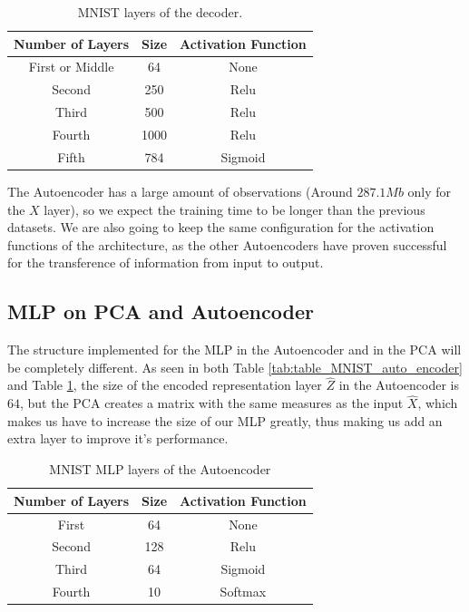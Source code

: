\begin{table}[H]
	\caption{MNIST layers of the decoder.}
	\label{tab:table_MNIST_auto_decoder}
	\begin{center}
		\begin{tabular}{c|c|c} %
			\textbf{Number of Layers} & \textbf{Size} & \textbf{Activation Function} \\
			\hline
			First or Middle & 64 & None\\
			Second & 250 & Relu\\
			Third & 500  & Relu\\
			Fourth & 1000 & Relu\\
			Fifth & 784 & Sigmoid \\
		\end{tabular}
	\end{center}
\end{table}

The Autoencoder has a large amount of observations (Around $287.1Mb$ only for the $X$ layer), so we expect the training time to be longer than the previous datasets. We are also going to keep the same configuration for the activation functions of the architecture, as the other Autoencoders  have proven successful for the transference of information from input to output. 

\subsection{MLP on PCA and Autoencoder}

The structure implemented for the MLP in the Autoencoder and in the PCA will be completely different. As seen in both Table \ref{tab:table_MNIST_auto_encoder} and Table \ref{tab:table_MNIST_auto_decoder}, the size of the encoded representation layer $\hat Z$ in the Autoencoder is $64$, but the PCA creates a matrix with the same measures as the input $\hat{X}$, which makes us have to increase the size of our MLP greatly, thus making us add an extra layer to improve it's performance.
%
\begin{table}[H]
	\caption{MNIST MLP layers of the Autoencoder}
		\label{tab:table_MNIST_MLP_auto}
	\begin{center}
		\begin{tabular}{c|c|c} %
			\textbf{Number of Layers} & \textbf{Size} & \textbf{Activation Function} \\
			\hline
			First & 64 & None\\
			Second & 128 & Relu\\
			Third & 64  & Sigmoid\\
			Fourth & 10 & Softmax\\
		\end{tabular}
	\end{center}
\end{table}


